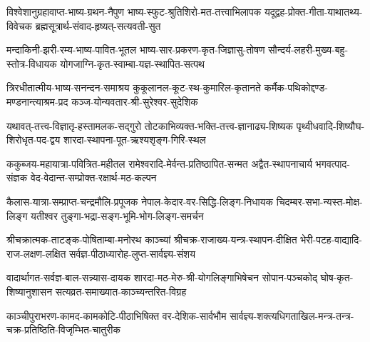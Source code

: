 \twolineshloka
{विश्वेशानुग्रहावाप्त-भाष्य-ग्रथन-नैपुण}
{भाष्य-स्फुट-श्रुतिशिरो-मत-तत्त्वाभिलापक}
\twolineshloka
{यदूद्वह-प्रोक्त-गीता-याथातथ्य-विवेचक}
{ब्रह्मसूत्रार्थ-संवाद-हृष्यत्-सत्यवती-सुत}
\jayavijayibhava

\twolineshloka
{मन्दाकिनी-झरी-रम्य-भाष्य-पावित-भूतल}
{भाष्य-सार-प्रकरण-कृत-जिज्ञासु-तोषण}
\twolineshloka
{सौन्दर्य-लहरी-मुख्य-बहु-स्तोत्र-विधायक}
{योगजाग्नि-कृत-स्वाम्बा-यज्ञ-स्थापित-सत्पथ}
\jayavijayibhava

\twolineshloka
{त्रिरधीतात्मीय-भाष्य-सनन्दन-समाश्रय}
{कुकूलानल-कूट-स्थ-कुमारिल-कृतानते}
\twolineshloka
{कर्मैक-पथिकोद्दण्ड-मण्डनान्त्याश्रम-प्रद}
{कञ्ज-योन्यवतार-श्री-सुरेश्वर-सुदेशिक}
\jayavijayibhava

\twolineshloka
{यथावत्-तत्त्व-विज्ञातृ-हस्तामलक-सद्गुरो}
{तोटकाभिव्यक्त-भक्ति-तत्त्व-ज्ञानाढ्य-शिष्यक}
\twolineshloka
{पृथ्वीधवादि-शिष्यौघ-शिरोधृत-पद-द्वय}
{शारदा-स्थापना-पूत-ऋश्यशृङ्ग-गिरि-स्थल}
\jayavijayibhava

\twolineshloka
{ककुब्जय-महायात्रा-पवित्रित-महीतल}
{रामेश्वरादि-मेर्वन्त-प्रतिष्ठापित-सन्मत}
\twolineshloka
{अद्वैत-स्थापनाचार्य भगवत्पाद-संज्ञक}
{वेद-वेदान्त-सम्प्रोक्त-रक्षार्थ-मठ-कल्पन}
\jayavijayibhava

\twolineshloka
{कैलास-यात्रा-सम्प्राप्त-चन्द्रमौलि-प्रपूजक}
{नेपाल-केदार-वर-सिद्धि-लिङ्ग-निधायक}
\twolineshloka
{चिदम्बर-सभा-न्यस्त-मोक्ष-लिङ्ग यतीश्वर}
{तुङ्गा-भद्रा-सङ्ग-भूमि-भोग-लिङ्ग-समर्चन}
\jayavijayibhava

\twolineshloka
{श्रीचक्रात्मक-ताटङ्क-पोषिताम्बा-मनोरथ}
{काञ्च्यां श्रीचक्र-राजाख्य-यन्त्र-स्थापन-दीक्षित}
\twolineshloka
{भेरी-पटह-वाद्यादि-राज-लक्षण-लक्षित}
{सर्वज्ञ-पीठाध्यारोह-लुप्त-सार्वज्ञ्य-संशय}
\jayavijayibhava

\twolineshloka
{वादार्थागत-सर्वज्ञ-बाल-सन्न्यास-दायक}
{शारदा-मठ-मेरु-श्री-योगलिङ्गाभिषेचन}
\twolineshloka
{सोपान-पञ्चकोद् घोष-कृत-शिष्यानुशासन}
{सत्यव्रत-समाख्यात-काञ्च्यन्तरित-विग्रह}
\jayavijayibhava

\twolineshloka
{काञ्चीपुराभरण-कामद-कामकोटि-पीठाभिषिक्त वर-देशिक-सार्वभौम}
{सार्वज्ञ्य-शक्त्यधिगताखिल-मन्त्र-तन्त्र-चक्र-प्रतिष्ठिति-विजृम्भित-चातुरीक}
\jayavijayibhava


\closesection


\centering

\vfill
{}
